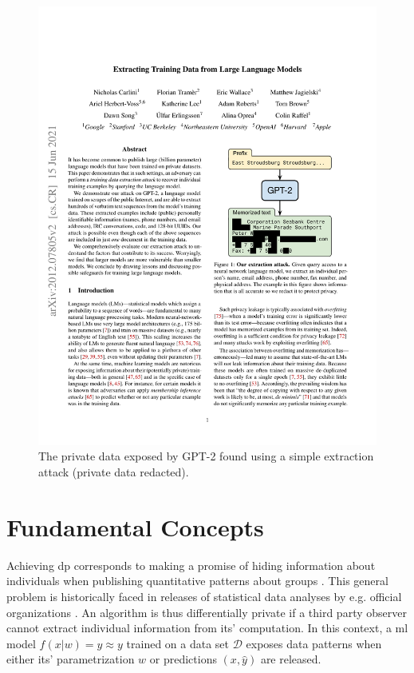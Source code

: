 \documentclass[12pt,fleqn,twocolumn]{article}
\begin{document}
\begin{figure}[H]
    \centering
        \includegraphics[clip, trim=11.5cm 12cm 2.5cm 8cm, width=.8\linewidth]{extracting.pdf}
        \caption{The private data exposed by GPT-2 found using a simple extraction attack \cite[Fig. 1]{carlini2021extracting} (private data redacted).}
    \label{fig:extracting.pdf}
\end{figure}\noindent

\section*{Fundamental Concepts}%
\label{sec:Fundamental Concepts}
Achieving \acrshort{dp} corresponds to making a promise of hiding information about individuals when publishing quantitative patterns about groups \cite[pp. 5]{dwork2014alg}.
This general problem is historically faced in releases of statistical data analyses by e.g. official organizations \cite{dalenius1977stat, wiki2022diff}.
An algorithm is thus differentially private if a third party observer cannot extract individual information from its' computation.
In this context, a \acrfull{ml} model \(f(x|w)=\hat y \approx y\) trained on a data set \(\mathcal D\) exposes data patterns when either its' parametrization $w$ or predictions $(x, \hat y)$ are released.
\end{document}
